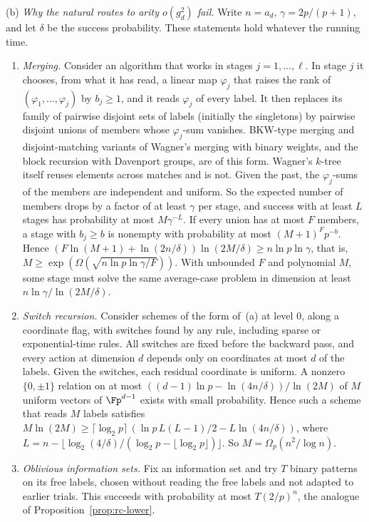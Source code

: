 \begin{remark}
\textup{(b)} \emph{Why the natural routes to arity $o(g_d^2)$ fail.} Write $n = a_d$, $\gamma = 2p/(p+1)$, and let $\delta$ be the success probability. These statements hold whatever the running time.
\begin{enumerate}[label=(\roman*),leftmargin=2em]
  \item \emph{Merging.} Consider an algorithm that works in stages $j = 1,\dots,\ell$. In stage $j$ it chooses, from what it has read, a linear map $\varphi_j$ that raises the rank of $(\varphi_1,\dots,\varphi_j)$ by $b_j \ge 1$, and it reads $\varphi_j$ of every label. It then replaces its family of pairwise disjoint sets of labels (initially the singletons) by pairwise disjoint unions of members whose $\varphi_j$-sum vanishes. BKW-type merging and disjoint-matching variants of Wagner's merging with binary weights, and the block recursion with Davenport groups, are of this form. Wagner's $k$-tree itself reuses elements across matches and is not. Given the past, the $\varphi_j$-sums of the members are independent and uniform. So the expected number of members drops by a factor of at least $\gamma$ per stage, and success with at least $L$ stages has probability at most $M\gamma^{-L}$. If every union has at most $F$ members, a stage with $b_j \ge b$ is nonempty with probability at most $(M+1)^Fp^{-b}$. Hence $(F\ln(M+1)+\ln(2n/\delta))\ln(2M/\delta) \ge n\ln p\ln\gamma$, that is, $M \ge \exp(\Omega(\sqrt{n\ln p\ln\gamma/F}))$. With unbounded $F$ and polynomial $M$, some stage must solve the same average-case problem in dimension at least $n\ln\gamma/\ln(2M/\delta)$.
  \item \emph{Switch recursion.} Consider schemes of the form of~(a) at level $0$, along a coordinate flag, with switches found by any rule, including sparse or exponential-time rules. All switches are fixed before the backward pass, and every action at dimension $d$ depends only on coordinates at most $d$ of the labels. Given the switches, each residual coordinate is uniform. A nonzero $\{0,\pm1\}$ relation on at most $((d-1)\ln p - \ln(4n/\delta))/\ln(2M)$ of $M$ uniform vectors of $\Fp^{d-1}$ exists with small probability. Hence such a scheme that reads $M$ labels satisfies $M\ln(2M) \ge \lceil\log_2p\rceil\,(\ln p\,L(L-1)/2 - L\ln(4n/\delta))$, where $L = n - \lfloor\log_2(4/\delta)/(\log_2p-\lfloor\log_2p\rfloor)\rfloor$. So $M = \Omega_p(n^2/\log n)$.
  \item \emph{Oblivious information sets.} Fix an information set and try $T$ binary patterns on its free labels, chosen without reading the free labels and not adapted to earlier trials. This succeeds with probability at most $T(2/p)^n$, the analogue of Proposition~\ref{prop:rc-lower}.

\end{enumerate}
\end{remark}
